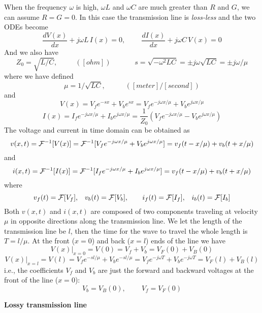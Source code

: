 When the frequency $\omega$ is high, $\omega L$ and $\omega C$ are much
greater than $R$ and $G$, we can assume $R=G=0$. In this case the transmission 
line is {\em loss-less} and the two ODEs become
\[
\frac{dV(x)}{dx}+j\omega L\,I(x)=0,\;\;\;\;\;\;\;\;
\frac{dI(x)}{dx}+j\omega C\,V(x)=0 
\]
And we also have
\[ Z_0 = \sqrt{L/C},\;\;\;\;\;\;\;\;\;([ohm])\;\;\;\;\;\;\;\;\;\;\;\;
s = \sqrt{-\omega^2 LC}=\pm j\omega\sqrt{LC}=\pm j\omega/\mu  \]
where we have defined 
\[ \mu=1/\sqrt{LC},\;\;\;\;\;\;\;\;\;\;([meter]/[second]) \]
and
\[ V(x) = V_f e^{-sx}+V_b e^{sx} = V_f e^{-j\omega x/\mu}+V_b e^{j\omega x/\mu} 
\]
\[ I(x) = I_f e^{-j\omega x/\mu}+I_b e^{j\omega x/\mu}
=\frac{1}{Z_0}\left(V_fe^{-j\omega x/\mu}-V_be^{j\omega x/\mu} \right) \]
The voltage and current in time domain can be obtained as
\[  v(x,t)={\cal F}^{-1}[V(x)]={\cal F}^{-1}[V_f e^{-j\omega x/\mu}+V_b e^{j\omega x/\mu}]
=v_f(t-x/\mu)+v_b(t+x/\mu) 
\]
and
\[  i(x,t)={\cal F}^{-1}[I(x)]={\cal F}^{-1}[I_f e^{-j\omega x/\mu}+I_b e^{j\omega x/\mu}]
  =v_f(t-x/\mu)+v_b(t+x/\mu)
\]
where
\[ v_f(t)={\cal F}[V_f],\;\;\;v_b(t)={\cal F}[V_b],\;\;\;\;\;\;\;
   i_f(t)={\cal F}[I_f],\;\;\;i_b(t)={\cal F}[I_b] \]
Both $v(x,t)$ and $i(x,t)$ are composed of two components traveling at velocity
$\mu$ in opposite directions along the transmission line. We let the length of 
the transmission line be $l$, then the time for the wave to travel the whole 
length is $T=l/\mu$. At the front ($x=0$) and back ($x=l$) ends of the line we 
have
\[ 
V(x)\big|_{x=0}=V(0)=V_f+V_b=V_F(0)+V_B(0) \]
\[ V(x)\big|_{x=l}=V(l)=V_f e^{-sl/\mu}+V_b e^{-sl/\mu}
=V_f e^{-j\omega T}+V_b e^{-j\omega T}=V_F(l)+V_B(l)
\]
i.e., the coefficients $V_f$ and $V_b$ are just the forward and backward 
voltages at the front of the line ($x=0$):
\[	V_b=V_B(0),\;\;\;\;\;\;\;\;V_f=V_F(0)	\]

{\bf Lossy transmission line}


